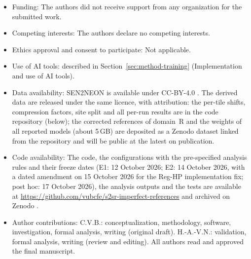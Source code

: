 \documentclass[pdflatex,sn-basic,referee,lineno]{sn-jnl}
\begin{document}
\begin{itemize}
\item Funding: The authors did not receive support from any organization for the submitted work.
\item Competing interests: The authors declare no competing interests.
\item Ethics approval and consent to participate: Not applicable.
\item Use of AI tools: described in Section~\ref{sec:method-training} (Implementation and use of AI tools).
\item Data availability: SEN2NEON is available under CC-BY-4.0 \citep{donike2026sen2neon}. The derived data are
released under the same licence, with attribution: the per-tile shifts, compression factors, site split and all
per-run results are in the code repository (below); the corrected references of domain~R and the weights of all
reported models (about 5\,GB) are deposited as a Zenodo dataset linked from the repository and will be public at the
latest on publication.
\item Code availability: The code, the configurations with the pre-specified analysis rules and their freeze dates
(E1: 12 October 2026; E2: 14 October 2026, with a dated amendment on 15 October 2026 for the Reg-HP implementation
fix; post hoc: 17 October 2026), the analysis outputs and the tests are available at \url{https://github.com/vubcfe/s2sr-imperfect-references} and archived on Zenodo
\citep{bui2026code}.
\item Author contributions: C.V.B.: conceptualization, methodology, software, investigation, formal analysis,
writing (original draft). H.-A.-V.N.: validation, formal analysis, writing (review and editing). All authors read
and approved the final manuscript.
\end{itemize}
\end{document}
